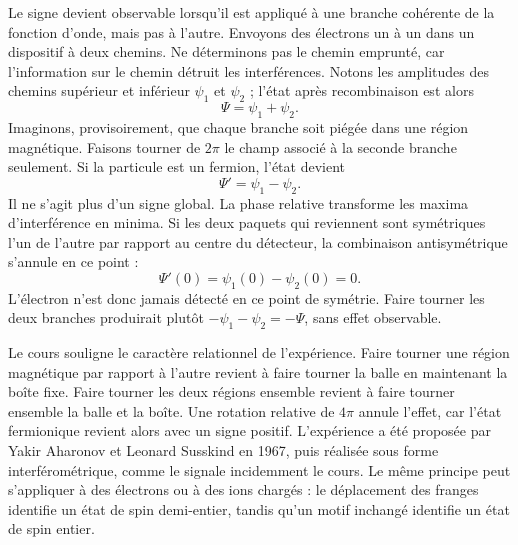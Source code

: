 Le signe devient observable lorsqu’il est appliqué à une branche cohérente de la fonction d’onde, mais pas à l’autre. Envoyons des électrons un à un dans un dispositif à deux chemins. Ne déterminons pas le chemin emprunté, car l’information sur le chemin détruit les interférences. Notons les amplitudes des chemins supérieur et inférieur \(\psi_1\) et \(\psi_2\) ; l’état après recombinaison est alors
\begin{equation}
\Psi=\psi_1+\psi_2.
\end{equation}
Imaginons, provisoirement, que chaque branche soit piégée dans une région magnétique. Faisons tourner de \(2\pi\) le champ associé à la seconde branche seulement. Si la particule est un fermion, l’état devient
\begin{equation}
\Psi'=\psi_1-\psi_2.
\end{equation}
Il ne s’agit plus d’un signe global. La phase relative transforme les maxima d’interférence en minima. Si les deux paquets qui reviennent sont symétriques l’un de l’autre par rapport au centre du détecteur, la combinaison antisymétrique s’annule en ce point :
\begin{equation}
\Psi'(0)=\psi_1(0)-\psi_2(0)=0.
\end{equation}
L’électron n’est donc jamais détecté en ce point de symétrie. Faire tourner les deux branches produirait plutôt \(-\psi_1-\psi_2=-\Psi\), sans effet observable.

Le cours souligne le caractère relationnel de l’expérience. Faire tourner une région magnétique par rapport à l’autre revient à faire tourner la balle en maintenant la boîte fixe. Faire tourner les deux régions ensemble revient à faire tourner ensemble la balle et la boîte. Une rotation relative de \(4\pi\) annule l’effet, car l’état fermionique revient alors avec un signe positif. L’expérience a été proposée par Yakir Aharonov et Leonard Susskind en 1967, puis réalisée sous forme interférométrique, comme le signale incidemment le cours. Le même principe peut s’appliquer à des électrons ou à des ions chargés : le déplacement des franges identifie un état de spin demi-entier, tandis qu’un motif inchangé identifie un état de spin entier.

\begin{classroomqa}
\end{classroomqa}


